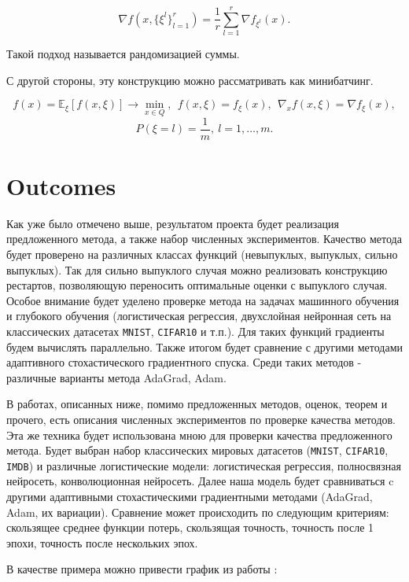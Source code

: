 \documentclass[]{scrartcl}
\begin{document}
\begin{equation}
\nabla f(x, \{\xi^l\}_{l=1}^r) = \frac{1}{r}\sum\limits_{l=1}^r\nabla f_{\xi^l}(x).
\end{equation}

Такой подход называется рандомизацией суммы.

С другой стороны, эту конструкцию можно рассматривать как минибатчинг. 

\begin{equation}
f(x) = \mathbb{E}_{\xi}[f(x, \xi)] \rightarrow \underset{x\in Q}\min,~~f(x,\xi) = f_{\xi}(x),~~\nabla_x f(x,\xi) = \nabla f_{\xi}(x),\end{equation}
$$P(\xi = l) = \frac{1}{m},~l=1,\dots,m.$$

	 
\section{Outcomes}
Как уже было отмечено выше, результатом проекта будет реализация предложенного метода, а также набор численных экспериментов. Качество метода будет проверено на различных классах функций (невыпуклых, выпуклых, сильно выпуклых). Так для сильно выпуклого случая можно реализовать конструкцию рестартов, позволяющую переносить оптимальные оценки с выпуклого случая. Особое внимание будет уделено проверке метода на задачах машинного обучения и глубокого обучения (логистическая регрессия, двухслойная нейронная сеть на классических датасетах \texttt{MNIST}, \texttt{CIFAR10} и т.п.). Для таких функций градиенты будем вычислять параллельно. Также итогом будет сравнение с другими методами адаптивного стохастического градиентного спуска. Среди таких методов - различные варианты метода AdaGrad, Adam. 

В работах, описанных ниже, помимо предложенных методов, оценок, теорем и прочего, есть описания численных экспериментов по проверке качества методов. Эта же техника будет использована мною для проверки качества предложенного метода. Будет выбран набор классических мировых датасетов (\texttt{MNIST}, \texttt{CIFAR10}, \texttt{IMDB}) и различные логистические модели: логистическая регрессия, полносвязная нейросеть, конволюционная нейросеть. Далее наша модель будет сравниваться c другими адаптивными стохастическими градиентными методами (AdaGrad, Adam, их вариации). Сравнение может происходить по следующим критериям: скользящее среднее функции потерь, скользящая точность, точность после 1 эпохи, точность после нескольких эпох.

В качестве примера можно привести график из работы \cite{deng2018optimal}:
\end{document}
